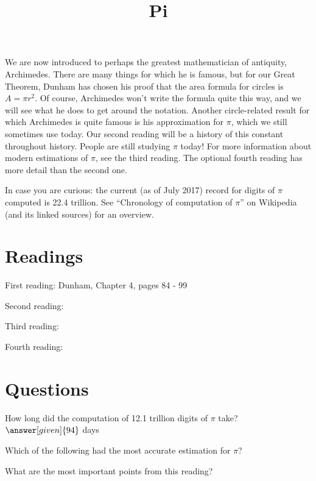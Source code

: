 \documentclass[nooutcomes]{ximera}
\title{Pi}
\begin{document}
\begin{abstract}
    
\end{abstract}
\maketitle

We are now introduced to perhaps the greatest mathematician of antiquity, Archimedes.  There are many things for which he is famous, but for our Great Theorem, Dunham has chosen his proof that the area formula for circles is $A = \pi r^2$.  Of course, Archimedes won't write the formula quite this way, and we will see what he does to get around the notation.  Another circle-related result for which Archimedes is quite famous is his approximation for $\pi$, which we still sometimes use today.  Our second reading will be a history of this constant throughout history.  People are still studying $\pi$ today!  For more information about modern estimations of $\pi$, see the third reading.  The optional fourth reading has more detail than the second one.

In case you are curious: the current (as of July 2017) record for digits of $\pi$ computed is 22.4 trillion.  See ``Chronology of computation of $\pi$'' on Wikipedia (and its linked sources) for an overview.


\section{Readings}
First reading: Dunham, Chapter 4, pages 84 - 99

Second reading: 

Third reading: 

Fourth reading: 

\section{Questions}

\begin{question}
How long did the computation of 12.1 trillion digits of $\pi$ take? $\answer[given]{94}$ days
\end{question}

\begin{question}
Which of the following had the most accurate estimation for $\pi$?
\begin{multipleChoice}
\end{multipleChoice}
\end{question}


\begin{question}
What are the most important points from this reading?
\begin{freeResponse}
\end{freeResponse}

\end{question}
\end{document}
